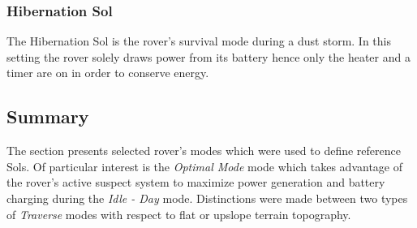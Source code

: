 
%

\subsubsection{Hibernation Sol}
\label{sec:ReferenceSols:HibernationSol}
The Hibernation Sol is the rover's survival mode during a dust storm. In this setting the rover solely draws power from its battery hence only the heater and a timer are on in order to conserve energy.



\subsection{Summary}
\label{sec:ReferenceSols:SummaryAndConclusion}
The section presents selected rover's modes which were used to define reference Sols. Of particular interest is the \textit{Optimal Mode} mode which takes advantage of the rover's active suspect system to maximize power generation and battery charging during the \textit{Idle - Day} mode. Distinctions were made between two types of \textit{Traverse} modes with respect to flat or upslope terrain topography.

